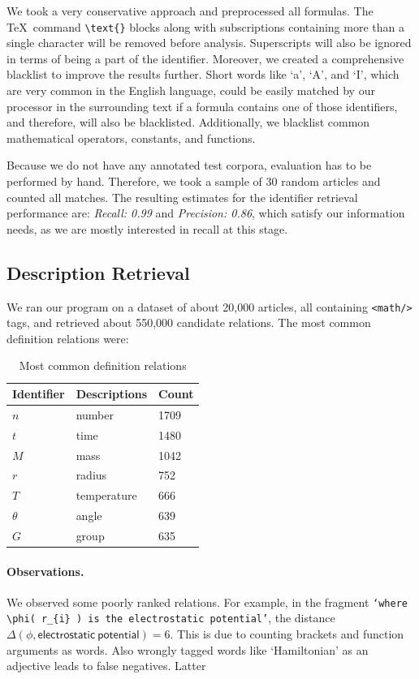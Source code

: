 \documentclass[runningheads]{llncs}
\begin{document}
We took a very conservative approach and preprocessed all formulas.
The \TeX~command \texttt{\textbackslash text\{\}} blocks along with subscriptions containing
more than a single character will be removed before analysis. Superscripts
will also be ignored in terms of being a part of the identifier. Moreover, we
created a comprehensive blacklist to improve the results further. Short words
like `a', `A', and `I', which are very common in the English language, could be
easily matched by our processor in the surrounding text if a formula contains
one of those identifiers, and therefore, will also be blacklisted. Additionally,
we blacklist common mathematical operators, constants, and functions.

Because we do not have any annotated test corpora, evaluation has to be performed by hand. 
Therefore, we took a sample of 30
random articles and counted all matches. The resulting estimates for the
identifier retrieval performance are: \emph{Recall: 0.99} and \emph{Precision:
0.86}, which satisfy our information needs, as we are mostly interested in recall
at this stage.


\subsection{Description Retrieval}
We ran our program on a dataset of about 20,000 articles, all containing
\texttt{<math/>} tags, and retrieved about 550,000 candidate relations. The
most common definition relations were:


\begin{table}[H]
	\begin{center}
	\begin{tabular}{| l | p{6.8cm} | l |}
		\hline
		Identifier & Descriptions & Count\\
		\hline
		$n$ & number & 1709 \\
		$t$ & time & 1480 \\
		$M$ & mass & 1042 \\
		$r$ & radius & 752 \\
		$T$ & temperature & 666 \\
		$\theta$ & angle & 639 \\
		$G$ & group & 635 \\
		\hline
	\end{tabular}
	\end{center}
\caption{Most common definition relations}
\end{table}


\paragraph{Observations.} We observed some poorly ranked relations. For
example, in the fragment \texttt{`where $\phi$( $r_{i}$ ) is the electrostatic
potential'}, the distance $\Delta(\phi, \mathsf{electrostatic\:potential} ) = 6$. This is due
to counting brackets and function arguments as words. Also wrongly tagged
words like `Hamiltonian' as an adjective leads to false negatives. Latter
\end{document}
